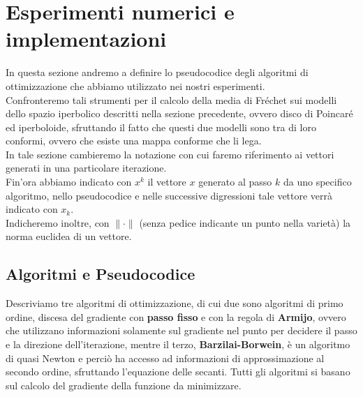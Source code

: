\documentclass[a4paper, 12pt]{article}
\begin{document}
\section{Esperimenti numerici e implementazioni}
In questa sezione andremo a definire lo pseudocodice degli algoritmi di ottimizzazione che abbiamo utilizzato  nei nostri esperimenti.\\
Confronteremo tali strumenti per il calcolo della media di Fréchet sui modelli dello spazio iperbolico descritti nella sezione precedente, ovvero disco di Poincaré ed iperboloide, sfruttando il fatto che questi due modelli sono tra di loro conformi, ovvero che esiste una mappa conforme che li lega.\\
In tale sezione cambieremo la notazione con cui faremo riferimento ai vettori generati in una particolare iterazione.\\
Fin'ora abbiamo indicato con $x^k$ il vettore $x$ generato al passo $k$ da uno specifico algoritmo, nello pseudocodice e nelle successive digressioni tale vettore verrà indicato con $x_k$.\\
Indicheremo inoltre, con $\| \cdot \|$ (senza pedice indicante un punto nella varietà) la norma euclidea di un vettore.\\
\subsection{Algoritmi e Pseudocodice}
Descriviamo tre algoritmi di ottimizzazione, di cui due sono algoritmi di primo ordine, discesa del gradiente con \textbf{passo fisso} e con la regola di \textbf{Armijo}, ovvero che utilizzano informazioni solamente sul gradiente nel punto per decidere il passo e la direzione dell'iterazione, mentre il terzo, \textbf{Barzilai-Borwein}, è un algoritmo di quasi Newton e perciò ha accesso ad informazioni di approssimazione al secondo ordine, sfruttando l'equazione delle secanti. Tutti gli algoritmi si basano sul calcolo del gradiente della funzione da minimizzare.
\end{document}
